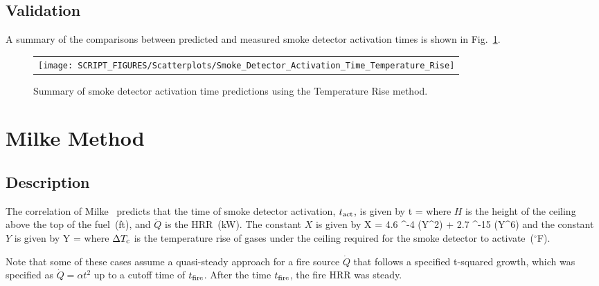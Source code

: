 

\clearpage


\subsection*{Validation}

A summary of the comparisons between predicted and measured smoke detector activation times is shown in Fig.~\ref{Smoke_Detector_Activation_Summary_Temperature_Rise}.

\begin{figure}[!ht]
\begin{center}
\begin{tabular}{l}
\texttt{[image: SCRIPT\_FIGURES/Scatterplots/Smoke\_Detector\_Activation\_Time\_Temperature\_Rise]}
\end{tabular}
\end{center}
\caption[Summary of smoke detector activation time predictions (Temperature Rise)]
{Summary of smoke detector activation time predictions using the Temperature Rise method.}
\label{Smoke_Detector_Activation_Summary_Temperature_Rise}
\end{figure}


\clearpage


\section{Milke Method}

\subsection*{Description}

The correlation of Milke~\cite{Milke:1} predicts that the time of smoke detector activation, $t\sb{act}$, is given by
\be
t = 
\label{eq:Milke}
\ee
where $H$ is the height of the ceiling above the top of the fuel~(\si{ft}), and $\dot Q$ is the HRR~(\si{kW}). The constant $X$ is given by
\be
X = 4.6 ^{-4} (Y^2) + 2.7 ^{-15} (Y^6)
\label{eq:Milke_X}
\ee
and the constant $Y$ is given by
\be
Y = 
\label{eq:Milke_Y}
\ee
where $\Delta T\sb{c}$ is the temperature rise of gases under the ceiling required for the smoke detector to activate~($^\circ$F).

Note that some of these cases assume a quasi-steady approach for a fire source $\dot Q$ that follows a specified t-squared growth, which was specified as $\dot Q = \alpha t^2$ up to a cutoff time of $t\sb{fire}$. After the time $t\sb{fire}$, the fire HRR was steady.


